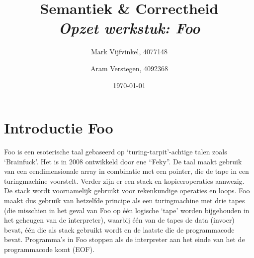 \documentclass[11pt]{article}
\title{\textbf{Semantiek \& Correctheid \\ \emph{Opzet werkstuk: Foo}}}
\author{
	Mark Vijfvinkel, 4077148
	\and Aram Verstegen, 4092368
}
\date{\today}
\begin{document}
\maketitle


\section{Introductie Foo}

Foo is een esoterische taal gebaseerd op `turing-tarpit'-achtige talen zoals `Brainfuck'. Het is in 2008 ontwikkeld door ene ``Feky''.
De taal maakt gebruik van een eendimensionale array in combinatie met een pointer, die de tape in een turingmachine voorstelt.
Verder zijn er een stack en kopieeroperaties aanwezig.
De stack wordt voornamelijk gebruikt voor rekenkundige operaties en loops.
Foo maakt dus gebruik van hetzelfde principe als een turingmachine met drie tapes (die misschien in het geval van Foo op \'e\'en logische `tape' worden bijgehouden in het geheugen van de interpreter), waarbij \'e\'en van de tapes de data (invoer) bevat, \'e\'en die als stack gebruikt wordt en de laatste die de programmacode bevat.
Programma's in Foo stoppen als de interpreter aan het einde van het de programmacode komt (EOF).
\end{document}
